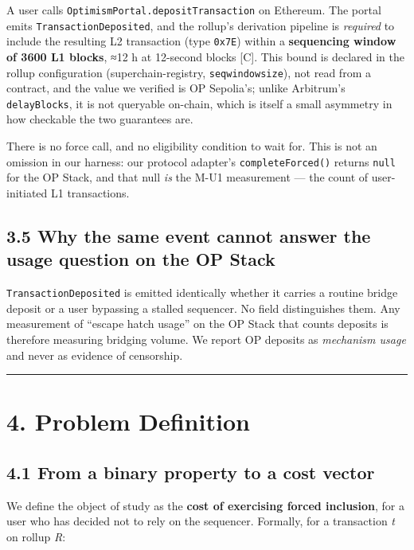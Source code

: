 \documentclass[conference]{IEEEtran}
\renewcommand{\_}{\textunderscore\allowbreak}
\begin{document}
A user calls \texttt{OptimismPortal.depositTransaction} on Ethereum. The
portal emits \texttt{TransactionDeposited}, and the rollup's derivation
pipeline is \emph{required} to include the resulting L2 transaction
(type \texttt{0x7E}) within a \textbf{sequencing window of 3600 L1
blocks}, ≈12 h at 12-second blocks {[}C{]}. This bound is declared in
the rollup configuration (superchain-registry,
\texttt{seq\_window\_size}), not read from a contract, and the value we
verified is OP Sepolia's; unlike Arbitrum's \texttt{delayBlocks}, it is
not queryable on-chain, which is itself a small asymmetry in how
checkable the two guarantees are.

There is no force call, and no eligibility condition to wait for. This
is not an omission in our harness: our protocol adapter's
\texttt{completeForced()} returns \texttt{null} for the OP Stack, and
that null \emph{is} the M-U1 measurement --- the count of user-initiated
L1 transactions.

\subsection{3.5 Why the same event cannot answer the usage question on
the OP
Stack}\label{why-the-same-event-cannot-answer-the-usage-question-on-the-op-stack}

\texttt{TransactionDeposited} is emitted identically whether it carries
a routine bridge deposit or a user bypassing a stalled sequencer. No
field distinguishes them. Any measurement of ``escape hatch usage'' on
the OP Stack that counts deposits is therefore measuring bridging
volume. We report OP deposits as \emph{mechanism usage} and never as
evidence of censorship.

\begin{center}\rule{0.5\linewidth}{0.5pt}\end{center}

\section{4. Problem Definition}\label{problem-definition}

\subsection{4.1 From a binary property to a cost
vector}\label{from-a-binary-property-to-a-cost-vector}

We define the object of study as the \textbf{cost of exercising forced
inclusion}, for a user who has decided not to rely on the sequencer.
Formally, for a transaction \emph{t} on rollup \emph{R}:
\end{document}
